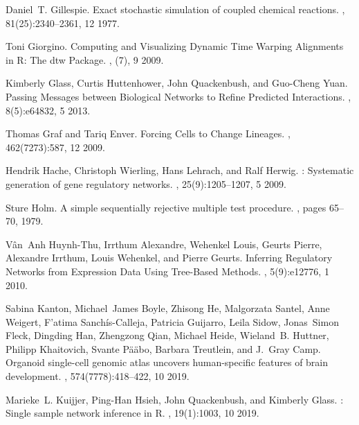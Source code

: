 \documentclass[10pt, a4paper]{article}
\begin{document}
\begin{thebibliography}{10}
	Daniel~T. Gillespie.
	\newblock Exact stochastic simulation of coupled chemical reactions.
	, 81(25):2340--2361, 12 1977.
	
	Toni Giorgino.
	\newblock Computing and {{Visualizing Dynamic Time Warping Alignments}} in
	{{R}}: {{The}} dtw {{Package}}.
	, (7), 9 2009.
	
	Kimberly Glass, Curtis Huttenhower, John Quackenbush, and Guo-Cheng Yuan.
	\newblock Passing {{Messages}} between {{Biological Networks}} to {{Refine
			Predicted Interactions}}.
	, 8(5):e64832, 5 2013.
	
	Thomas Graf and Tariq Enver.
	\newblock Forcing {{Cells}} to {{Change Lineages}}.
	, 462(7273):587, 12 2009.
	
	Hendrik Hache, Christoph Wierling, Hans Lehrach, and Ralf Herwig.
	: Systematic generation of gene regulatory networks.
	, 25(9):1205--1207, 5 2009.
	
	Sture Holm.
	\newblock A simple sequentially rejective multiple test procedure.
	, pages 65--70, 1979.
	
	V{\^a}n~Anh Huynh-Thu, Irrthum Alexandre, Wehenkel Louis, Geurts Pierre,
	Alexandre Irrthum, Louis Wehenkel, and Pierre Geurts.
	\newblock Inferring {{Regulatory Networks}} from {{Expression Data Using
			Tree}}-{{Based Methods}}.
	, 5(9):e12776, 1 2010.
	
	Sabina Kanton, Michael~James Boyle, Zhisong He, Malgorzata Santel, Anne
	Weigert, F{\a'a}tima Sanch\'is-Calleja, Patricia Guijarro, Leila Sidow,
	Jonas~Simon Fleck, Dingding Han, Zhengzong Qian, Michael Heide, Wieland~B.
	Huttner, Philipp Khaitovich, Svante P{\"a}{{\"a}}bo, Barbara Treutlein, and
	J.~Gray Camp.
	\newblock Organoid single-cell genomic atlas uncovers human-specific features
	of brain development.
	, 574(7778):418--422, 10 2019.
	
	Marieke~L. Kuijjer, Ping-Han Hsieh, John Quackenbush, and Kimberly Glass.
	: Single sample network inference in {{R}}.
	, 19(1):1003, 10 2019.
	

\end{thebibliography}
\end{document}
